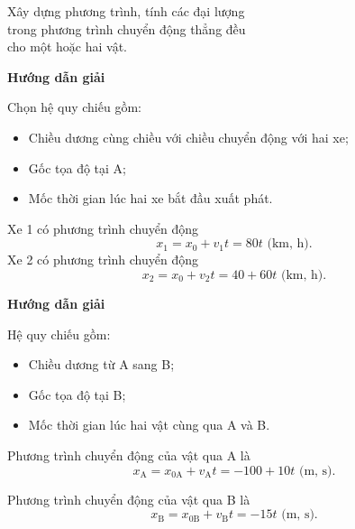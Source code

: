 \begin{dang}{Xây dựng phương trình, tính các đại lượng\\ trong phương trình chuyển động thẳng đều\\ cho một hoặc hai vật.}
	{	\begin{center}
			\textbf{Hướng dẫn giải}
		\end{center}
		
		Chọn hệ quy chiếu gồm:
		\begin{itemize}
			\item Chiều dương cùng chiều với chiều chuyển động với hai xe;
			\item Gốc tọa độ tại A;
			\item Mốc thời gian lúc hai xe bắt đầu xuất phát.
		\end{itemize}
		
		Xe 1 có phương trình chuyển động
		\begin{equation*}
			x_1=x_0 + v_1t = 80t\textrm{ (km, h)}.
		\end{equation*}
		Xe 2 có phương trình chuyển động  
		\begin{equation*}
			x_2=x_0 + v_2t = 40+60t\textrm{ (km, h)}.
		\end{equation*}
	}
	{	\begin{center}
			\textbf{Hướng dẫn giải}
		\end{center}
		
		
		Hệ quy chiếu gồm:
		\begin{itemize}
			\item Chiều dương từ A sang B;
			\item Gốc tọa độ tại B;
			\item Mốc thời gian lúc hai vật cùng qua A và B.
		\end{itemize}
		
		Phương trình chuyển động của vật qua A là
		\begin{equation*}
			x_\text{A}=x_{0\text{A}} + v_\text{A}t =-100+10t\textrm{ (m, s)}.
		\end{equation*}
		
		Phương trình chuyển động của vật qua B là
		\begin{equation*}
			x_\text{B}=x_{0\text{B}} + v_\text{B}t = -15t\textrm{ (m, s)}.
		\end{equation*}
		
	}
\end{dang}

